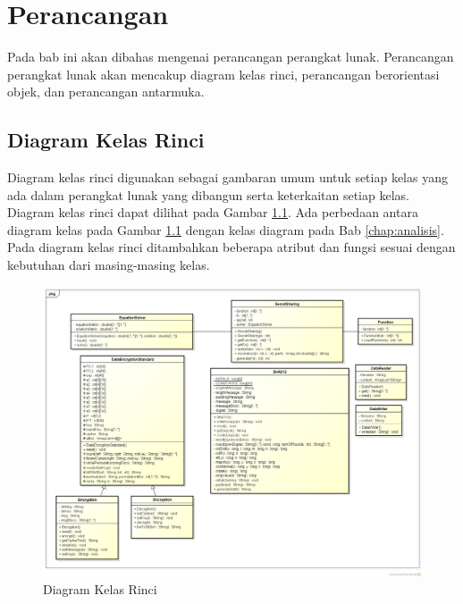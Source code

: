 \chapter{Perancangan}
\label{chap:perancangan}

Pada bab ini akan dibahas mengenai perancangan perangkat lunak. Perancangan perangkat lunak akan mencakup diagram kelas rinci, perancangan berorientasi objek, dan perancangan antarmuka.

\section{Diagram Kelas Rinci}

Diagram kelas rinci digunakan sebagai gambaran umum untuk setiap kelas yang ada dalam perangkat lunak yang dibangun serta keterkaitan setiap kelas. Diagram kelas rinci dapat dilihat pada Gambar \ref{fig:final_class_diagram}. Ada perbedaan antara diagram kelas pada Gambar \ref{fig:final_class_diagram} dengan kelas diagram pada Bab \ref{chap:analisis}. Pada diagram kelas rinci ditambahkan beberapa atribut dan fungsi sesuai dengan kebutuhan dari masing-masing kelas.

\begin{figure}
	\centerline{\includegraphics[scale=0.5]{Gambar/final_class_diagram}}
	\caption{Diagram Kelas Rinci}\label{fig:final_class_diagram}
\end{figure}


